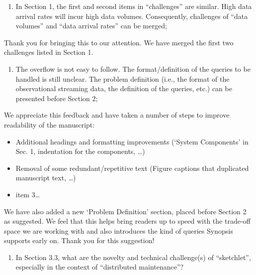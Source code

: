 \documentclass{article}
\begin{document}
\begin{enumerate}
\def\labelenumi{(\arabic{enumi})}
\item
  In Section 1, the first and second items in ``challenges'' are
  similar. High data arrival rates will incur high data volumes.
  Consequently, challenges of ``data volumes'' and ``data arrival
  rates'' can be merged;
\end{enumerate}

\begin{tcolorbox}
Thank you for bringing this to our attention. We have merged the first
two challenges listed in Section 1.
\end{tcolorbox}

\begin{enumerate}
\def\labelenumi{(\arabic{enumi})}
\setcounter{enumi}{1}
\item
  The overflow is not easy to follow. The format/definition of the
  queries to be handled is still unclear. The problem definition (i.e.,
  the format of the observational streaming data, the definition of the
  queries, etc.) can be presented before Section 2;
\end{enumerate}

\begin{tcolorbox}
We appreciate this feedback and have taken a number of steps to improve
readability of the manuscript:

\begin{itemize}
\item
  Additional headings and formatting improvements (`System Components'
  in Sec. 1, indentation for the components, \ldots{})
\item
  Removal of some redundant/repetitive text (Figure captions that
  duplicated manuscript text, \ldots{})
\item
  item 3\ldots{}
\end{itemize}

We have also added a new `Problem Definition' section, placed before
Section 2 as suggested. We feel that this helps bring readers up to
speed with the trade-off space we are working with and also introduces
the kind of queries Synopsis supports early on. Thank you for this
suggestion!
\end{tcolorbox}

\begin{enumerate}
\def\labelenumi{(\arabic{enumi})}
\setcounter{enumi}{2}
\item
  In Section 3.3, what are the novelty and technical challenge(s) of
  ``sketchlet'', especially in the context of ``distributed
  maintenance''?
\end{enumerate}
\end{document}
